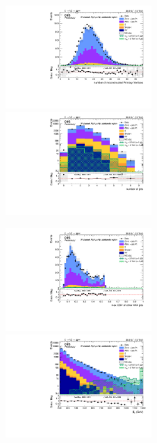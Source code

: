\begin{figure}[!htb]
  \begin{center}  
    \includegraphics[width=0.495\textwidth]{plots/v9_U/XVZnnhpSB/nPV.pdf}
    \includegraphics[width=0.495\textwidth]{plots/v9_U/XVZnnhpSB/nJets.pdf}

    \includegraphics[width=0.495\textwidth]{plots/v9_U/XVZnnhpSB/MaxJetBTag.pdf}
    \includegraphics[width=0.495\textwidth]{plots/v9_U/XVZnnhpSB/MEt_pt.pdf}


\end{center}
\end{figure}
